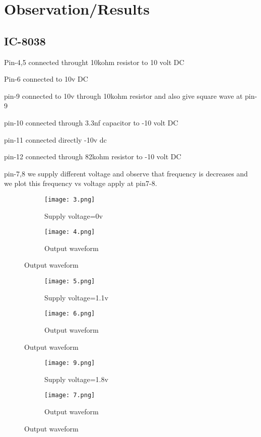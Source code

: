 \documentclass{article}
\begin{document}
\section{Observation/Results}
\subsection{IC-8038}
Pin-4,5 connected throught 10kohm resistor to 10 volt DC\par
Pin-6 connected to 10v DC\par

pin-9 connected to 10v through 10kohm resistor and also give square wave at pin-9\par
pin-10 connected through 3.3nf capacitor to -10 volt DC\par
pin-11 connected directly -10v dc\par
pin-12 connected through 82kohm resistor to -10 volt DC\par
pin-7,8 we supply different voltage and observe that frequency is decreases and we plot this frequency vs voltage apply at pin7-8.\par


\begin{figure}[ht]
  \begin{subfigure}[b]{0.6\textwidth}
    \texttt{[image: 3.png]}
    \caption{Supply voltage=0v}
    \label{fig:1}
  \end{subfigure}
  \begin{subfigure}[b]{0.6\textwidth}
    \texttt{[image: 4.png]}
    \caption{Output waveform}
    \label{fig:2}
  \end{subfigure}
\end{figure}


\begin{figure}[ht]
  \begin{subfigure}[b]{0.6\textwidth}
    \texttt{[image: 5.png]}
    \caption{Supply voltage=1.1v}
    \label{fig:1}
  \end{subfigure}
  \begin{subfigure}[b]{0.6\textwidth}
    \texttt{[image: 6.png]}
    \caption{Output waveform}
    \label{fig:2}
  \end{subfigure}
\end{figure}


\begin{figure}[ht]
  \begin{subfigure}[b]{0.6\textwidth}
    \texttt{[image: 9.png]}
    \caption{Supply voltage=1.8v}
    \label{fig:1}
  \end{subfigure}
  \begin{subfigure}[b]{0.6\textwidth}
    \texttt{[image: 7.png]}
    \caption{Output waveform}
    \label{fig:2}
  \end{subfigure}
\end{figure}
\end{document}
